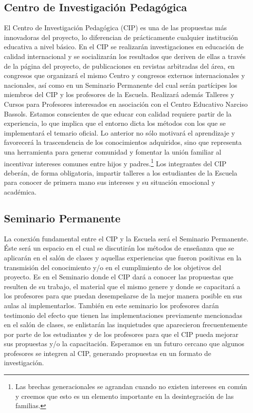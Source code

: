 \documentclass[10pt,letterpaper,oneside]{book}
\begin{document}
\subsection{Centro de Investigación Pedagógica}
El Centro de Investigación Pedagógica (CIP) es una de las propuestas más innovadoras del proyecto, lo diferencian de prácticamente cualquier institución educativa a nivel básico. En el CIP se realizarán investigaciones en educación de calidad internacional y se socializarán los resultados que deriven de ellas a través de la página del proyecto, de publicaciones en revistas arbitradas del área, en congresos que organizará el mismo Centro y congresos externos internacionales y nacionales, así como en un Seminario Permanente del cual serán partícipes los miembros del CIP y los profesores de la Escuela. Realizará además Talleres y Cursos para Profesores interesados en asociación con el Centro Educativo Narciso Bassols. Estamos conscientes de que educar con calidad requiere partir de la experiencia, lo que implica que el entorno dicta los métodos con los que se implementará el temario oficial. Lo anterior no sólo motivará el aprendizaje y favorecerá la trascendencia de los conocimientos adquiridos, sino que representa una herramienta para generar comunidad y fomentar la unión familiar al incentivar intereses comunes entre hijos y padres.\footnote{Las brechas generacionales se agrandan cuando no existen intereses en común y creemos que esto es un elemento importante en la desintegración de las familias.} Los integrantes del CIP deberán, de forma obligatoria, impartir talleres a los estudiantes de la Escuela para conocer de primera mano sus intereses y su situación emocional y académica.
\subsection{Seminario Permanente}
La conexión fundamental entre el CIP y la Escuela será el Seminario Permanente. Éste será un espacio en el cual se discutirán los métodos de enseñanza que se aplicarán en el salón de clases y aquellas experiencias que fueron positivas en la transmisión del conocimiento y/o en el cumplimiento de los objetivos del proyecto. Es en el Seminario donde el CIP dará a conocer las propuestas que resulten de su trabajo, el material que el mismo genere y donde se capacitará a los profesores para que puedan desempeñarse de la mejor manera posible en sus aulas al implementarlos. También en este seminario los profesores darán testimonio del efecto que tienen las implementaciones previamente mencionadas en el salón de clases, se enlistarán las inquietudes que aparecieron frecuentemente por parte de los estudiantes y de los profesores para que el CIP pueda mejorar sus propuestas y/o la capacitación. Esperamos en un futuro cercano que algunos profesores se integren al CIP, generando propuestas en un formato de investigación.
\end{document}
